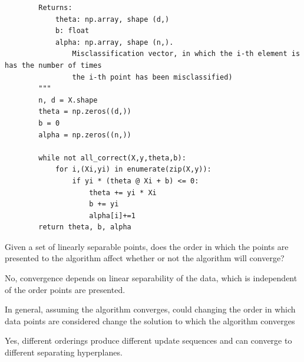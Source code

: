 \documentclass[12pt, letterpaper]{article}
\begin{document}
\begin{solution}
\begin{verbatim}
        Returns:
            theta: np.array, shape (d,)
            b: float
            alpha: np.array, shape (n,). 
                Misclassification vector, in which the i-th element is has the number of times 
                the i-th point has been misclassified)
        """
        n, d = X.shape
        theta = np.zeros((d,))
        b = 0
        alpha = np.zeros((n,))

        while not all_correct(X,y,theta,b):
            for i,(Xi,yi) in enumerate(zip(X,y)):
                if yi * (theta @ Xi + b) <= 0:
                    theta += yi * Xi
                    b += yi
                    alpha[i]+=1
        return theta, b, alpha
    \end{verbatim}
\end{solution}

\begin{subproblem}{}
    Given a set of linearly separable points, does the order in which the points are presented to the
algorithm affect whether or not the algorithm will converge?
\end{subproblem}
\begin{solution}{}
    No, convergence depends on linear separability of the data, which is independent of the order points are presented.
\end{solution}

\begin{subproblem}{}
    In general, assuming the algorithm converges, could changing the order in which data points are
considered change the solution to which the algorithm converges
\end{subproblem}
\begin{solution}
    Yes, different orderings produce different update sequences and can converge to different separating hyperplanes.
\end{solution}
\end{document}
